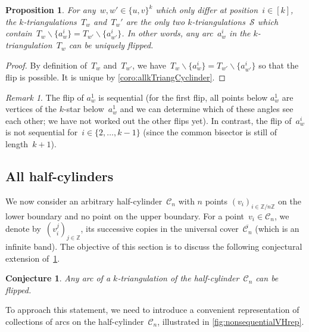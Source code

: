 \documentclass{amsart}
\newtheorem{proposition}[theorem]{Proposition}
\newtheorem{conjecture}[theorem]{Conjecture}
\theoremstyle{remark}
\newtheorem{remark}[theorem]{Remark}
\newcommand{\Z}{\mathbb{Z}} %
\newcommand{\ssm}{\smallsetminus} %
\newcommand{\surface}{\mathcal{S}}
\newcommand{\cylinder}{\mathcal{C}}
\begin{document}
\begin{proposition}
\label{prop:flip2halfCylinder}
For any~$w, w' \in \{u,v\}^k$ which only differ at position~$i \in [k]$, the $k$-triangulations~$T_w$ and~$T_w'$ are the only two $k$-triangulations~$\surface$ which contain~${T_w \ssm \{a_w^i\} = T_{w'} \ssm \{a_{w'}^i\}}$. In other words, any arc~$a_w^i$ in the $k$-triangulation~$T_w$ can be uniquely flipped.
\end{proposition}

\begin{proof}
By definition of~$T_w$ and~$T_{w'}$, we have~${T_w \ssm \{a_w^i\} = T_{w'} \ssm \{a_{w'}^i\}}$ so that the flip is possible.
It is unique by \cref{coro:allkTriangCyclinder}.
\end{proof}

\begin{remark}
The flip of $a_w^1$ is sequential (for the first flip, all points below $a_w^1$ are vertices of the $k$-star below~$a_w^1$ and we can determine which of these angles see each other; we have not worked out the other flips yet).
In contrast, the flip of~$a_w^i$ is not sequential for~$i \in \{2, \dots, k-1\}$ (since the common bisector is still of length~$k+1$).
\end{remark}


\subsection{All half-cylinders}

We now consider an arbitrary half-cylinder~$\cylinder_n$ with $n$ points $(v_i)_{i \in \Z/n\Z}$ on the lower boundary and no point on the upper boundary. 
For a point~$v_i \in \cylinder_n$, we denote by~$(v_i^j)_{j \in \Z}$, its successive copies in the universal cover~$\overline{\cylinder_n}$ (which is an infinite band).
The objective of this section is to discuss the following conjectural extension of~\cref{prop:flip2halfCylinder}.

\begin{conjecture}
\label{conj:flipHalfCylinder}
Any arc of a $k$-triangulation of the half-cylinder~$\cylinder_n$ can be flipped.
\end{conjecture}

To approach this statement, we need to introduce a convenient representation of collections of arcs on the half-cylinder~$\cylinder_n$, illustrated in \cref{fig:nonsequentialVHrep}.
\end{document}
